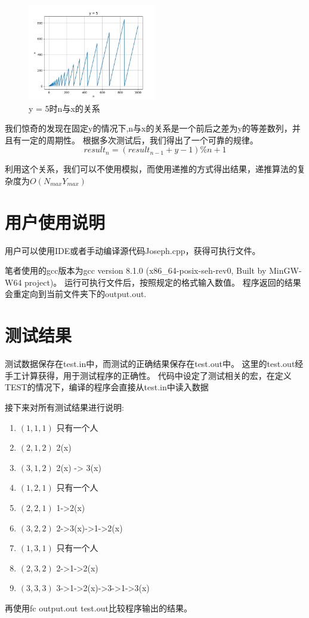    \begin{figure}[H]
      \centering
      \includegraphics[width=0.5\textwidth]{images/y5.png}
      \caption{y = 5时n与x的关系}
   \end{figure}


   我们惊奇的发现在固定y的情况下,n与x的关系是一个前后之差为y的等差数列，并且有一定的周期性。
   根据多次测试后，我们得出了一个可靠的规律。
   $$ result_{n} = (result_{n-1} + y - 1) \% n + 1 $$

   利用这个关系，我们可以不使用模拟，而使用递推的方式得出结果，递推算法的复杂度为$O(N_{max}Y_{max})$

\section{用户使用说明}

   用户可以使用IDE或者手动编译源代码Joseph.cpp，获得可执行文件。
   
   笔者使用的gcc版本为gcc version 8.1.0 (x86_64-posix-seh-rev0, Built by MinGW-W64 project)。
   运行可执行文件后，按照规定的格式输入数值。
   程序返回的结果会重定向到当前文件夹下的output.out.

\section{测试结果}

   测试数据保存在test.in中，而测试的正确结果保存在test.out中。
   这里的test.out经手工计算获得，用于测试程序的正确性。
   代码中设定了测试相关的宏，在定义TEST的情况下，编译的程序会直接从test.in中读入数据


   接下来对所有测试结果进行说明:
   \begin{enumerate}
      \item $(1,1,1)$  只有一个人
      \item $(2,1,2)$  2(x)
      \item $(3,1,2)$  2(x) -> 3(x)
      \item $(1,2,1)$  只有一个人
      \item $(2,2,1)$  1->2(x)
      \item $(3,2,2)$  2->3(x)->1->2(x)
      \item $(1,3,1)$  只有一个人
      \item $(2,3,2)$  2->1->2(x)
      \item $(3,3,3)$  3->1->2(x)->3->1->3(x)
   \end{enumerate}

   再使用fc output.out test.out比较程序输出的结果。


